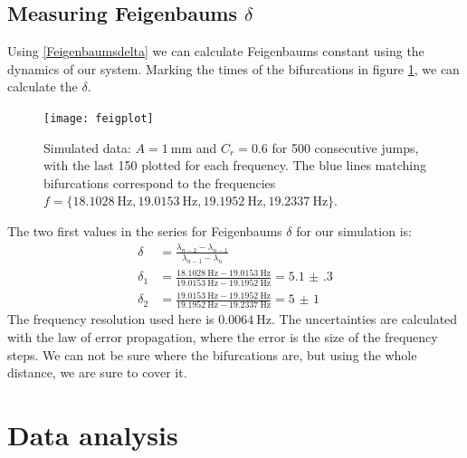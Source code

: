 \documentclass[12pt,oneside,a4paper]{article}
\numberwithin{equation}{section}
\begin{document}
{{{{\subsection{Measuring Feigenbaums $\delta$}
Using \eqref{Feigenbaumsdelta} we can calculate Feigenbaums constant using the dynamics of our system. Marking the times of the bifurcations in figure  \ref{feigsim}, we can calculate the $\delta$.
\begin{figure}[h]
\centering
\texttt{[image: feigplot]} 
\caption{Simulated data: $A=\SI{1}{\mm}$ and $C_r=\num{0.6}$ for 500 consecutive jumps, with the last 150 plotted for each frequency. The blue lines matching bifurcations correspond to the frequencies $f=\{\SI{18.1028}{\hertz},\SI{19.0153}{\hertz},\SI{19.1952}{\hertz},\SI{19.2337}{\hertz} \}$.}\label{feigsim}
\end{figure}
The two first values in the series for Feigenbaums $\delta$ for our simulation is:
\begin{align}
\delta&=\frac{\lambda_{n-2} - \lambda_{n-1}}{\lambda_{n-1}-\lambda_n}\\
\delta_1&=\frac{\SI{18.1028}{\hertz}-\SI{19.0153}{\hertz}}{\SI{19.0153}{\hertz}-\SI{19.1952}{\hertz}} = \num{5.1(3)}\\
\delta_2&=\frac{\SI{19.0153}{\hertz}-\SI{19.1952}{\hertz}}{\SI{19.1952}{\hertz}-\SI{19.2337}{\hertz}} = \num{5(1)}
\end{align}
The frequency resolution used here is $\SI{0.0064}{\hertz}$. The uncertainties are calculated with the law of error propagation, where the error is the size of the frequency steps. We can not be sure where the bifurcations are, but using the whole distance, we are sure to cover it.  
\section{Data analysis}
}}}}
\end{document}
